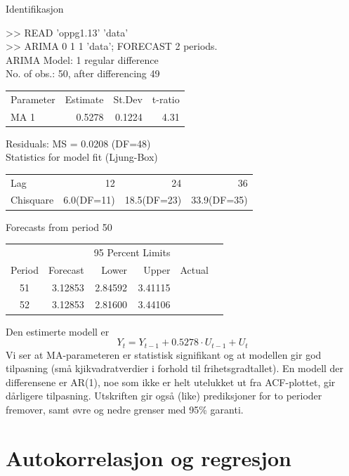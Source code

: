 \begin{eksempel}{Identifikasjon}
\begin{center}
{\begin{minipage}{9cm}
 >> READ 'oppg1.13' 'data'\\
 >> ARIMA 0 1 1 'data'; FORECAST 2 periods. \\
ARIMA Model:  1 regular difference\\
No. of obs.:  50, after differencing 49\\
\begin{tabular}{lrrr}
 Parameter  & Estimate & St.Dev &  t-ratio \\
 MA 1       &  0.5278  & 0.1224 &   4.31 \\
 \end{tabular}

Residuals:  MS = 0.0208  (DF=48) \\  
Statistics for model fit (Ljung-Box)\\
\begin{tabular}{lrrr}
Lag       &          12  &          24 &           36 \\  
Chisquare &   6.0(DF=11) &  18.5(DF=23)&   33.9(DF=35) \\ 
\end{tabular}

Forecasts from period 50 \\
\begin{tabular}{crrrrr}
        &              &\multicolumn{2}{c}{95 Percent Limits}     \\
Period  &    Forecast  &      Lower  &      Upper  & Actual \\
  51    &     3.12853  &    2.84592  &    3.41115  &  \\
  52    &     3.12853  &    2.81600  &    3.44106  &  \\
\end{tabular}
\end{minipage}} \end{center}
Den estimerte modell er
\[   Y_t=Y_{t-1}+0.5278\cdot U_{t-1} + U_t  \]
Vi ser at MA-parameteren er statistisk signifikant og at modellen gir god 
tilpasning (små kjikvadratverdier i forhold til frihetsgradtallet).
En modell der differensene er AR(1), noe som ikke er helt utelukket ut fra
ACF-plottet, gir dårligere tilpasning. Utskriften gir også (like) 
prediksjoner for to perioder fremover, samt øvre og nedre grenser med 
95\% garanti.
\end{eksempel}




\section{Autokorrelasjon og regresjon}

